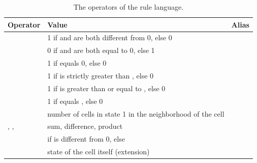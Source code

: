 \begin{table}[H]
    \centering\small
    \begin{tabularx}{\textwidth}{@{}l L l@{}}
        \toprule
        Operator                                             & Value                                                               & Alias        \\
        \midrule
                                              & 1 if  and  are both different from 0, else 0        &    \\
                                              & 0 if  and  are both equal to 0, else 1              &     \\
                                                & 1 if  equals 0, else 0                                      &    \\
                                             & 1 if  is strictly greater than , else 0             &     \\
                                           & 1 if  is greater than or equal to , else 0          &     \\
                                              & 1 if  equals , else 0                               &              \\
                                            & number of cells in state 1 in the neighborhood  of the cell &
                                                                                                                                      \\
        , ,  & sum, difference, product                                            &              \\
                                           &  if  is different from 0, else              &     \\
                                                & state of the cell itself (extension)                                &  \\
        \bottomrule
    \end{tabularx}
    \caption{The operators of the rule language.}
\end{table}


